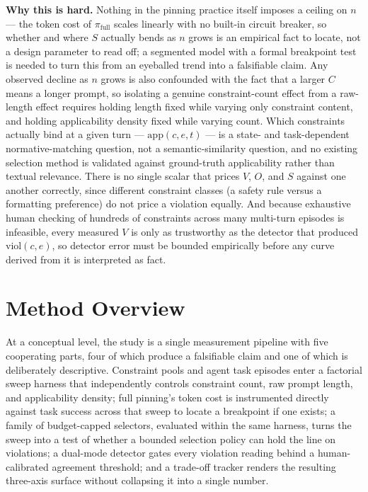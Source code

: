\documentclass[11pt]{article}
\begin{document}
\noindent\textbf{Why this is hard.} Nothing in the pinning practice itself imposes a ceiling on $n$ --- the token cost of $\pi_{\text{full}}$ scales linearly with no built-in circuit breaker, so whether and where $S$ actually bends as $n$ grows is an empirical fact to locate, not a design parameter to read off; a segmented model with a formal breakpoint test is needed to turn this from an eyeballed trend into a falsifiable claim. Any observed decline as $n$ grows is also confounded with the fact that a larger $C$ means a longer prompt, so isolating a genuine constraint-count effect from a raw-length effect requires holding length fixed while varying only constraint content, and holding applicability density fixed while varying count. Which constraints actually bind at a given turn --- $\mathrm{app}(c,e,t)$ --- is a state- and task-dependent normative-matching question, not a semantic-similarity question, and no existing selection method is validated against ground-truth applicability rather than textual relevance. There is no single scalar that prices $V$, $O$, and $S$ against one another correctly, since different constraint classes (a safety rule versus a formatting preference) do not price a violation equally. And because exhaustive human checking of hundreds of constraints across many multi-turn episodes is infeasible, every measured $V$ is only as trustworthy as the detector that produced $\mathrm{viol}(c,e)$, so detector error must be bounded empirically before any curve derived from it is interpreted as fact.

\section{Method Overview}

At a conceptual level, the study is a single measurement pipeline with five cooperating parts, four of which produce a falsifiable claim and one of which is deliberately descriptive. Constraint pools and agent task episodes enter a factorial sweep harness that independently controls constraint count, raw prompt length, and applicability density; full pinning's token cost is instrumented directly against task success across that sweep to locate a breakpoint if one exists; a family of budget-capped selectors, evaluated within the same harness, turns the sweep into a test of whether a bounded selection policy can hold the line on violations; a dual-mode detector gates every violation reading behind a human-calibrated agreement threshold; and a trade-off tracker renders the resulting three-axis surface without collapsing it into a single number.
\end{document}
